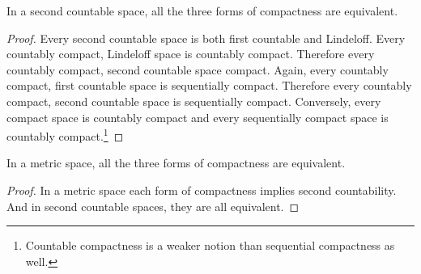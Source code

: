 \begin{theorem}
	In a second countable space, all the three forms of compactness are equivalent.\cite[11.1.10]{joshi}
\end{theorem}
\begin{proof}
	Every second countable space is both first countable and Lindeloff. Every countably compact, Lindeloff space is countably compact. Therefore every countably compact, second countable space compact. Again, every countably compact, first countable space is sequentially compact. Therefore every countably compact, second countable space is sequentially compact. Conversely, every compact space is countably compact and every sequentially compact space is countably compact.\footnote{Countable compactness is a weaker notion than sequential compactness as well.}
\end{proof}

\begin{theorem}
	In a metric space, all the three forms of compactness are equivalent.\cite[11.1.11]{joshi}
\end{theorem}
\begin{proof}
	In a metric space each form of compactness implies second countability. And in second countable spaces, they are all equivalent.
\end{proof}



